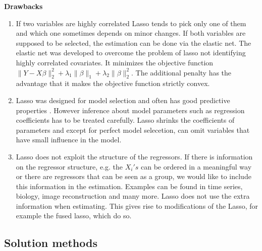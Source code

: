 \documentclass{article}
\theoremstyle{definition}
\begin{document}

\noindent\textbf{Drawbacks}
\begin{enumerate}
	\item If two variables are highly correlated Lasso tends to pick only one of them and which one sometimes depends on minor changes.  If both variables are supposed to be selected, the estimation can be done via the elastic net. The elastic net was developed to overcome the problem of lasso not identifying highly correlated covariates. It minimizes the objective function $\| Y-X\beta\|_2^2+\lambda_1 \| \beta\|_1 +\lambda_2\|\beta\|_2^2$. The additional penalty has the advantage that it makes the objective function strictly convex.
	\item Lasso was designed for model selection and often has good predictive properties \citep{belloni2014}. However inference about model parameters such as regression coefficients has to be treated carefully. Lasso shrinks the coefficients of parameters and except for perfect model selecetion, can omit variables that have small influence in the model.
	\item Lasso does not exploit the structure of the regressors. If there is information on the regressor structure, e.g. the $X_i's$ can be ordered in a meaningful way or there are regressors that can be seen as a group, we would like to include this information in the estimation. Examples can be found in time series, biology, image reconstruction and many more.
	Lasso does not use the extra information when estimating. This gives rise to modifications of the Lasso, for example the fused lasso, which do so. 
\end{enumerate}

\subsection{Solution methods}
\end{document}
